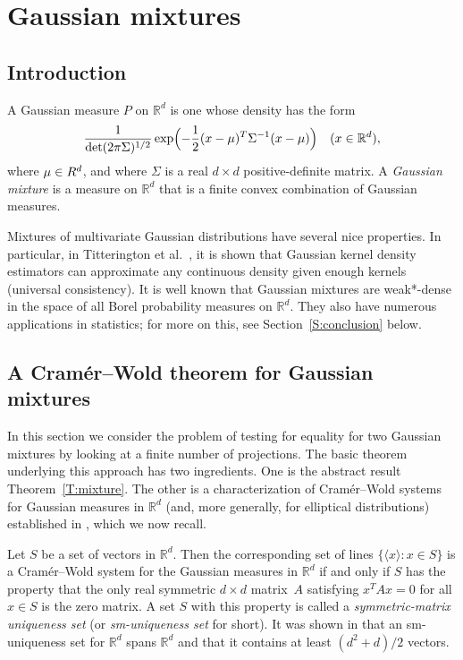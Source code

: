 \documentclass[11pt]{amsart}
\theoremstyle{plain}
\theoremstyle{remark}
\newcommand{\RR}{\mathbb{R}}
\begin{document}
	
	
\section{Gaussian mixtures}\label{S:Gaussian}
	
\subsection{Introduction}
	
A Gaussian measure $P$ on $\RR^d$ is one whose density has the form
\begin{equation}\label{E:density}
\frac{1}{\det(2\pi\Sigma)^{1/2}}\exp\Bigl(-\frac{1}{2}(x-\mu)^T\Sigma^{-1}(x-\mu)\Bigr)
\quad(x\in\RR^d),
\end{equation}
where $\mu\in\mathbb\RR^d$,
and where $\Sigma$ is a real $d\times d$  positive-definite matrix.
A \emph{Gaussian mixture} is a measure on $\RR^d$ that is a finite convex combination of Gaussian measures.
	
Mixtures of multivariate Gaussian distributions have several nice properties. 
In particular, in Titterington et al.\ \cite{TSM85}, 
it is shown that Gaussian kernel density estimators 
can approximate any continuous density given enough kernels (universal consistency). 
It is well known that Gaussian mixtures are  weak*-dense in
the space of all Borel probability measures on  $\RR^d$.
They also have numerous applications in statistics; 
for more on this, see Section~\ref{S:conclusion} below.
	
	
\subsection{A Cram\'er--Wold theorem for Gaussian mixtures}
	
In this section we consider the problem of testing for equality for two Gaussian mixtures
by looking at a finite number of projections.
The basic theorem underlying this approach has two ingredients. 
One is the abstract result Theorem~\ref{T:mixture}. 
The other is a characterization of Cram\'er--Wold systems for  Gaussian measures  in $\RR^d$
(and, more generally, for elliptical distributions) 
established in \cite[Theorems~1 and~2]{FMR23a}, which we now recall.
	
Let $S$ be a set of vectors in $\RR^d$. 
Then the corresponding set of lines $\{\langle x\rangle:x\in S\}$
is a Cram\'er--Wold system for the Gaussian measures in $\RR^d$
if and only if $S$ has the property that
the only real symmetric $d\times d$ matrix~$A$ satisfying $x^TAx=0$ for all $x\in S$
is the zero matrix.
A set $S$ with this  property is called a  \emph{symmetric-matrix uniqueness set} 
(or \emph{sm-uniqueness set} for short).
It was shown in \cite{FMR23a} that an sm-uniqueness set for $\RR^d$ spans $\RR^d$ 
and that it contains at least $(d^2+d)/2$ vectors.
\end{document}
